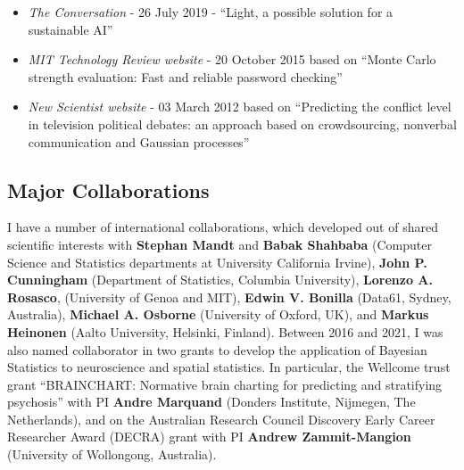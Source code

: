 \documentclass[oneside, a4paper, onecolumn, 10pt]{article}
\begin{document}
\begin{itemize}
\item {\em The Conversation} - 26 July 2019 - ``Light, a possible solution for a sustainable AI''
\item {\em MIT Technology Review website} - 20 October 2015 based on ``Monte Carlo strength evaluation: Fast and reliable password checking''
\item {\em New Scientist website} - 03 March 2012 based on ``Predicting the conflict level in television political debates: an approach based on crowdsourcing, nonverbal communication and Gaussian processes''
\end{itemize}

\subsection*{Major Collaborations}

I have a number of international collaborations, which developed out of shared scientific interests with {\bf Stephan Mandt} and {\bf Babak Shahbaba} (Computer Science and Statistics departments at University California Irvine), {\bf John P. Cunningham} (Department of Statistics, Columbia University), {\bf Lorenzo A. Rosasco}, (University of Genoa and MIT), {\bf Edwin V. Bonilla} (Data61, Sydney, Australia), {\bf Michael A. Osborne} (University of Oxford, UK), and {\bf Markus Heinonen} (Aalto University, Helsinki, Finland).
Between 2016 and 2021, I was also named collaborator in two grants to develop the application of Bayesian Statistics to neuroscience and spatial statistics. 
In particular, the Wellcome trust grant ``BRAINCHART: Normative brain charting for predicting and stratifying psychosis'' with PI {\bf Andre Marquand} (Donders Institute, Nijmegen, The Netherlands), and on the Australian Research Council Discovery Early Career Researcher Award (DECRA) grant with PI {\bf Andrew Zammit-Mangion} (University of Wollongong, Australia).

\end{document}
